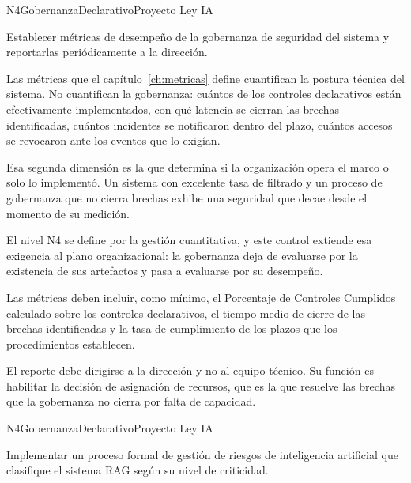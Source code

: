   {N4}{Gobernanza}{Declarativo}{Proyecto Ley IA}

Establecer métricas de desempeño de la gobernanza de seguridad del sistema y reportarlas periódicamente a la dirección.

Las métricas que el capítulo~\ref{ch:metricas} define cuantifican la postura técnica del sistema. No cuantifican la gobernanza: cuántos de los controles declarativos están efectivamente implementados, con qué latencia se cierran las brechas identificadas, cuántos incidentes se notificaron dentro del plazo, cuántos accesos se revocaron ante los eventos que lo exigían.

Esa segunda dimensión es la que determina si la organización opera el marco o solo lo implementó. Un sistema con excelente tasa de filtrado y un proceso de gobernanza que no cierra brechas exhibe una seguridad que decae desde el momento de su medición.

El nivel N4 se define por la gestión cuantitativa, y este control extiende esa exigencia al plano organizacional: la gobernanza deja de evaluarse por la existencia de sus artefactos y pasa a evaluarse por su desempeño.

Las métricas deben incluir, como mínimo, el Porcentaje de Controles Cumplidos calculado sobre los controles declarativos, el tiempo medio de cierre de las brechas identificadas y la tasa de cumplimiento de los plazos que los procedimientos establecen.

El reporte debe dirigirse a la dirección y no al equipo técnico. Su función es habilitar la decisión de asignación de recursos, que es la que resuelve las brechas que la gobernanza no cierra por falta de capacidad.


  {N4}{Gobernanza}{Declarativo}{Proyecto Ley IA}

Implementar un proceso formal de gestión de riesgos de inteligencia artificial que clasifique el sistema RAG según su nivel de criticidad.

